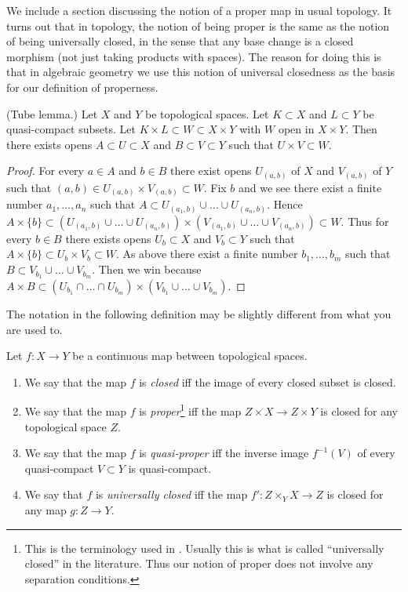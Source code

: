 \noindent
We include a section discussing the notion of a proper map in usual
topology. It turns out that in topology, the notion of being proper
is the same as the notion of being universally closed, in the sense
that any base change is a closed morphism (not just taking products
with spaces). The reason for doing this is that in algebraic geometry
we use this notion of universal closedness as the basis for our
definition of properness.

\begin{lemma}
\label{lemma-tube}
(Tube lemma.)
Let $X$ and $Y$ be topological spaces.
Let $K \subset X$ and $L \subset Y$ be quasi-compact subsets.
Let $K \times L \subset W \subset X \times Y$ with $W$
open in $X \times Y$. Then there exists opens $A \subset U \subset X$
and $B \subset V \subset Y$ such that $U \times V \subset W$.
\end{lemma}

\begin{proof}
For every $a \in A$ and $b \in B$ there exist opens
$U_{(a, b)}$ of $X$ and $V_{(a, b)}$ of $Y$ such that
$(a, b) \in U_{(a, b)} \times V_{(a, b)} \subset W$.
Fix $b$ and we see there exist a finite number $a_1, \ldots, a_n$
such that $A \subset U_{(a_1, b)} \cup \ldots \cup U_{(a_n, b)}$.
Hence $A \times \{b\} \subset
(U_{(a_1, b)} \cup \ldots \cup U_{(a_n, b)}) \times
(V_{(a_1, b)} \cup \ldots \cup V_{(a_n, b)}) \subset W$.
Thus for every $b \in B$ there exists opens $U_b \subset X$ and
$V_b \subset Y$ such that $A \times \{b\} \subset U_b \times V_b \subset W$.
As above there exist a finite number $b_1, \ldots, b_m$ such
that $B \subset V_{b_1} \cup \ldots \cup V_{b_m}$.
Then we win because
$A \times B \subset
(U_{b_1} \cap \ldots \cap U_{b_m}) \times
(V_{b_1} \cup \ldots \cup V_{b_m})$.
\end{proof}

\noindent
The notation in the following definition may be slightly different
from what you are used to.

\begin{definition}
\label{definition-proper-map}
Let $f : X\to Y$ be a continuous map between topological spaces.
\begin{enumerate}
\item We say that the map $f$ is {\it closed}
iff the image of every closed subset is closed.
\item We say that the map $f$ is {\it proper}\footnote{This is the
terminology used in \cite{Bourbaki}. Usually this is what
is called ``universally closed'' in the literature. Thus our notion
of proper does not involve any separation conditions.} iff
the map $Z\times X\to Z\times Y$ is closed for any topological space
$Z$.
\item We say that the map $f$ is {\it quasi-proper} iff
the inverse image $f^{-1}(V)$ of every quasi-compact $V \subset
Y$ is quasi-compact.
\item We say that $f$ is {\it universally closed} iff
the map $f': Z \times_Y X \to Z$ is closed for any map $g: Z \to Y$.
\end{enumerate}
\end{definition}


